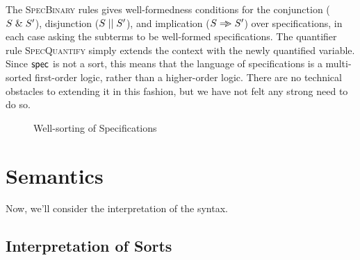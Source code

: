 The \textsc{SpecBinary} rules gives well-formedness conditions for the
conjunction ($S \;\&\; S'$), disjunction ($S \;||\; S'$), and
implication ($S \Rightarrow\!\!\!> S'$) over specifications, in each case asking
the subterms to be well-formed specifications. The quantifier rule
\textsc{SpecQuantify} simply extends the context with the newly
quantified variable. Since $\mathsf{spec}$ is not a sort, this means that
the language of specifications is a multi-sorted first-order logic,
rather than a higher-order logic. There are no technical obstacles to
extending it in this fashion, but we have not felt any strong need to
do so.



\begin{figure}
\caption{Well-sorting of Specifications}
\label{logic-spec-ok}
\end{figure}

\section{Semantics}

Now, we'll consider the interpretation of the syntax. 

\subsection{Interpretation of Sorts}

